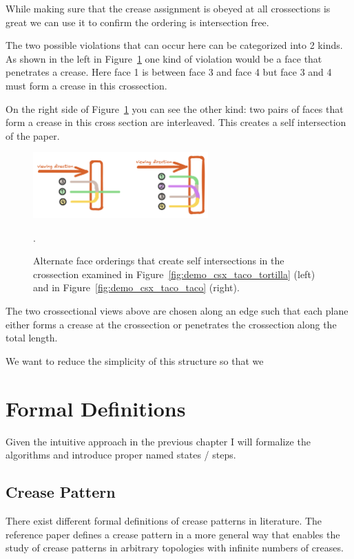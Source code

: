 While making sure that the crease assignment is obeyed at all crossections is great we can use it to confirm the ordering is intersection free.

The two possible violations that can occur here can be categorized into 2 kinds.
As shown in the left in Figure~\ref{fig:demo_csx_bad_ordering} one kind of violation would be a face that penetrates a crease.
Here face 1 is between face 3 and face 4 but face 3 and 4 must form a crease in this crossection.

On the right side of Figure~\ref{fig:demo_csx_bad_ordering} you can see the other kind: two pairs of faces that form a crease in this cross section are interleaved.
This creates a self intersection of the paper.
 
\begin{figure}[h]
\centering
\includegraphics[width=0.6\textwidth]{assets/demo_csx_bad_ordering.png}
\caption{Alternate face orderings that create self intersections in the crossection examined in Figure~\ref{fig:demo_csx_taco_tortilla} (left) and in Figure~\ref{fig:demo_csx_taco_taco} (right).}.
\label{fig:demo_csx_bad_ordering}
\end{figure}

The two crossectional views above are chosen along an edge such that each plane either forms a crease at the crossection or penetrates the crossection along the total length.

We want to reduce the simplicity of this structure so that we 


\chapter{Formal Definitions}

Given the intuitive approach in the previous chapter I will formalize the algorithms and introduce
proper named states / steps.

\section{Crease Pattern}

There exist different formal definitions of crease patterns in literature.
The reference paper defines a crease pattern in a more general way that enables the study of crease patterns in arbitrary topologies with infinite numbers of creases.


